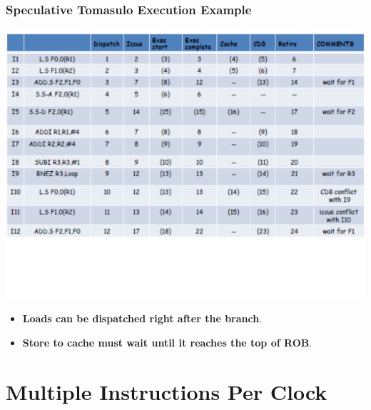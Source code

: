 \documentclass{beamer}
\newcommand{\emp}[1]{\textcolor{DikuRed}{ #1}}
\begin{document}
\begin{frame}[fragile,t]
\frametitle{Speculative Tomasulo Execution Example}

\includegraphics[width=67ex]{FigsOoOProc/SpecTomasuloEg.pdf}
\vspace{-15ex}

\begin{itemize}
    \item \emp{\bf Loads can be dispatched right after the branch}.
    \item \emp{\bf Store to cache must wait until it reaches the top of ROB}.
\end{itemize}
\end{frame}



\section{Multiple Instructions Per Clock}
\end{document}
